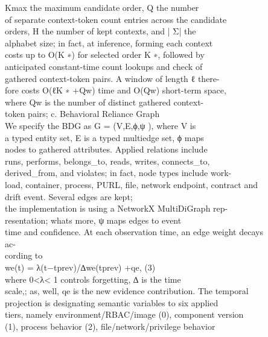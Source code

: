 \documentclass[conference]{IEEEtran}
\begin{document}
Kmax the maximum candidate order, Q the number\\
of separate context-token count entries across the candidate\\
orders, H the number of kept contexts, and | Σ|{} the\\
alphabet size; in fact, at inference, forming each context\\
costs up to O(K ∗) for selected order K ∗, followed by\\
anticipated constant-time count lookups and check of\\
gathered context-token pairs. A window of length ℓ there-\\
fore costs O(ℓK ∗ +Qw) time and O(Qw) short-term space,\\
where Qw is the number of distinct gathered context-\\
token pairs; c. Behavioral Reliance Graph\\
We specify the BDG as G = (V,E,ϕ,ψ ), where V is\\
a typed entity set, E is a typed multiedge set, ϕ maps\\
nodes to gathered attributes. Applied relations include\\
runs, performs, belongs\_to, reads, writes, connects\_to,\\
derived\_from, and violates; in fact, node types include work-\\
load, container, process, PURL, file, network endpoint, contract and\\
drift event. Several edges are kept;\\
the implementation is using a NetworkX MultiDiGraph rep-\\
resentation; what\textquotesingle s more, ψ maps edges to event\\
time and confidence. At each observation time, an edge weight decays\\
ac-\\
cording to\\
we(t) = λ(t−tprev)/∆we(tprev) +qe, (3)\\
where 0\textless λ\textless{} 1 controls forgetting, ∆ is the time\\
scale,; as, well, qe is the new evidence contribution. The temporal\\
projection is designating semantic variables to six applied\\
tiers, namely environment/RBAC/image (0), component version\\
(1), process behavior (2), file/network/privilege behavior\\
\end{document}
